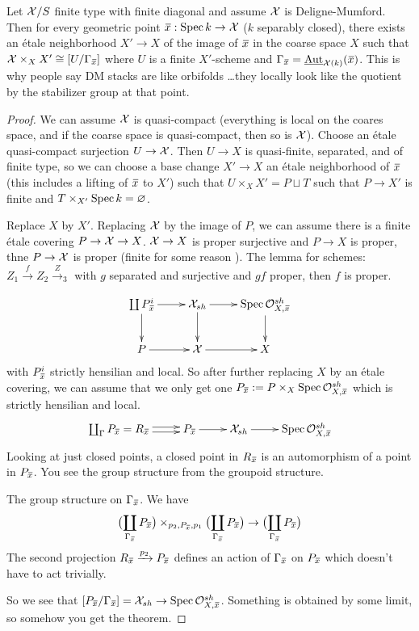 \begin{theorem}
  Let $\mathcal{X}/S$ finite type with finite diagonal and assume $\mathcal{X}$ is
Deligne-Mumford. Then for every geometric point $\bbar x:\spec k\to
\X$ ($k$ separably closed), there exists an \'etale neighborhood
$X'\to X$ of the image of $\bbar x$ in the coarse space $X$ such that
$\X\times_X X'\cong [U/\Ga_{\bbar x}]$ where $U$ is a finite
$X'$-scheme and $\Ga_{\bbar x}=\aut_{\X(k)}(\bbar x)$. This is why
people say DM stacks are like orbifolds \dots they locally look like
the quotient by the stabilizer group at that point.
\end{theorem}
\begin{proof}
  We can assume $\mathcal{X}$ is quasi-compact (everything is local on the
coares space, and if the coarse space is quasi-compact, then so is
$\mathcal{X}$). Choose an \'etale quasi-compact surjection $U\to \mathcal{X}$. Then
$U\to X$ is quasi-finite, separated, and of finite type, so we can
choose a base change $X'\to X$ an \'etale neighborhood of $\bbar x$
(this includes a lifting of $\bbar x$ to $X'$) such that $U\times_X
X'=P\sqcup T$ such that $P\to X'$ is finite and $T\times_{X'}\operatorname{Spec}
k=\varnothing$.

  Replace $X$ by $X'$. Replacing $\mathcal{X}$ by the image of $P$, we can
assume there is a finite \'etale covering $P\to \mathcal{X}\to X$. $\mathcal{X}\to X$
is proper surjective and $P\to X$ is proper, thne $P\to \mathcal{X}$ is proper
(finite for some reason ). The lemma for
schemes: $Z_1\xrightarrow f Z_2 \xrightarrow Z_3$ with $g$ separated
and surjective and $gf$ proper, then $f$ is proper.

  \[\xymatrix{
    \coprod P^i_{\bbar x} \ar[r]\ar[d]& \X_{sh} \ar[d]\ar[r] & \spec
\O_{X,\bbar x}^{sh}\ar[d]\\
    P\ar[r] & \X\ar[r] & X 
  }\]
  with $P^i_{\bbar x}$ strictly hensilian and local. So after further
replacing $X$ by an \'etale covering, we can assume that we only get
one $P_{\bbar x}:=P\times_X \spec \O_{X,\bbar x}^{sh}$ which is
strictly hensilian and local.
  \[\xymatrix{
    \coprod_\Ga P_{\bbar x}=R_{\bbar x}\ar@<.5ex>[r]\ar@<-.5ex>[r]
&P_{\bbar x} \ar[r] & \X_{sh} \ar[r] & \spec \O_{X,\bbar x}^{sh}
  }\]
  Looking at just closed points, a closed point in $R_{\bbar x}$ is
an automorphism of a point in $P_{\bbar x}$. You see the group
structure from the groupoid structure.

  The group structure on $\Ga_{\bbar x}$. We have
  \[
   \bigl(\coprod_{\Ga_{\bbar x}} P_{\bbar
x}\bigr)\times_{p_2,P_{\bbar x}, p_1}\bigl(\coprod_{\Ga_{\bbar x}}
P_{\bbar x}\bigr) \to \bigl(\coprod_{\Ga_{\bbar x}} P_{\bbar x}\bigr)
  \]
  The second projection $R_{\bbar x}\xrightarrow{p_2} P_{\bbar x}$
defines an action of $\Ga_{\bbar x}$ on $P_{\bbar x}$ which doesn't
have to act trivially.

  So we see that $[P_{\bbar x}/\Ga_{\bbar x}]=\X_{sh}\to \spec
\O_{X,\bbar x}^{sh}$. Something is obtained by some limit, so somehow
you get the theorem.
\end{proof}
